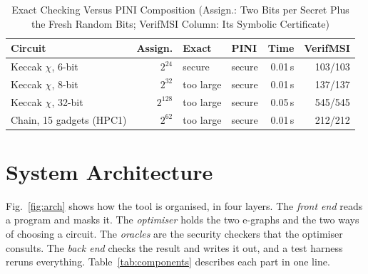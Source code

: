\documentclass[conference]{IEEEtran}
\begin{document}
\begin{table}[t]
\caption{Exact Checking Versus PINI Composition (Assign.: Two Bits per Secret Plus the Fresh Random Bits; VerifMSI Column: Its Symbolic Certificate)}\label{tab:pini}
\centering\footnotesize
\setlength{\tabcolsep}{4pt}
\begin{tabular}{@{}lrllrr@{}}
\toprule
Circuit & Assign. & Exact & PINI & Time & VerifMSI\\\midrule
Keccak $\chi$, 6-bit & $2^{24}$ & secure & secure & 0.01\,s & 103/103\\
Keccak $\chi$, 8-bit & $2^{32}$ & too large & secure & 0.01\,s & 137/137\\
Keccak $\chi$, 32-bit & $2^{128}$ & too large & secure & 0.05\,s & 545/545\\
Chain, 15 gadgets (HPC1) & $2^{62}$ & too large & secure & 0.01\,s & 212/212\\
\bottomrule
\end{tabular}
\end{table}

\section{System Architecture}\label{sec:arch}
Fig.~\ref{fig:arch} shows how the tool is organised, in four layers. The \emph{front end} reads a program and masks it. The \emph{optimiser} holds the two e-graphs and the two ways of choosing a circuit. The \emph{oracles} are the security checkers that the optimiser consults. The \emph{back end} checks the result and writes it out, and a test harness reruns everything. Table~\ref{tab:components} describes each part in one line.
\end{document}
